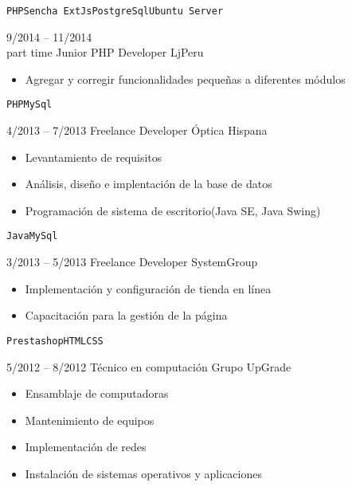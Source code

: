 \begin{entrylist}
{\begin{itemize}
    	    \end{itemize}
		    \texttt{PHP}\slashsep\texttt{Sencha ExtJs}\slashsep\texttt{PostgreSql}\slashsep\texttt{Ubuntu Server}
        }
	\entry
		{9/2014 -- 11/2014\\\footnotesize{part time}}
		{Junior PHP Developer}
		{LjPeru}
		{
		    \vspace{-5mm}
    	    \begin{itemize}
    	        \setlength\itemsep{0pt}
    	        \item Agregar y corregir funcionalidades pequeñas a diferentes módulos
    	    \end{itemize}
		    \texttt{PHP}\slashsep\texttt{MySql}
        }
	\entry
		{4/2013 -- 7/2013}
		{Freelance Developer}
		{Óptica Hispana}
		{
		    \vspace{-5mm}
    	    \begin{itemize}
    	        \setlength\itemsep{0pt}
    	        \item Levantamiento de requisitos
    	        \item Análisis, diseño e implentación de la base de datos
    	        \item Programación de sistema de escritorio(Java SE, Java Swing)
    	    \end{itemize}
		    \texttt{Java}\slashsep\texttt{MySql}
        }
	\entry
		{3/2013 -- 5/2013}
		{Freelance Developer}
		{SystemGroup}
		{
		    \vspace{-5mm}
		    \begin{itemize}
		        \setlength\itemsep{0pt}
		        \item Implementación y configuración de tienda en línea
		        \item Capacitación para la gestión de la página
		    \end{itemize}
		    \texttt{Prestashop}\slashsep\texttt{HTML}\slashsep\texttt{CSS}
        }
	\entry
		{5/2012 -- 8/2012}
		{Técnico en computación}
		{Grupo UpGrade}
    	{
    	    \vspace{-5mm}
    	    \begin{itemize}
    	        \setlength\itemsep{0pt}
    	        \item Ensamblaje de computadoras
    	        \item Mantenimiento de equipos
    	        \item Implementación de redes
    	        \item Instalación de sistemas operativos y aplicaciones
    	    \end{itemize}
        }
\end{entrylist}